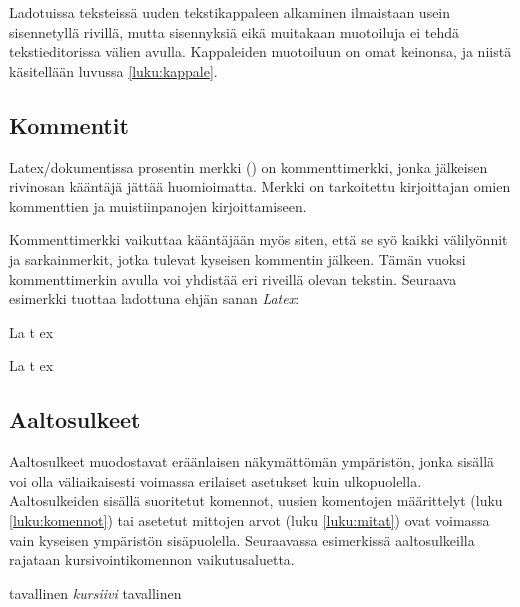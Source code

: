 Ladotuissa teksteissä uuden tekstikappaleen alkaminen ilmaistaan usein
sisennetyllä rivillä, mutta sisennyksiä eikä muitakaan muotoiluja ei
tehdä tekstieditorissa välien avulla. Kappaleiden muotoiluun on omat
keinonsa, ja niistä käsitellään luvussa \ref{luku:kappale}.

\subsection{Kommentit}

Latex\-/dokumentissa prosentin merkki (\koodi{\%}) on kommenttimerkki,
jonka jälkeisen rivin\-osan kääntäjä jättää huomioimatta. Merkki on
tarkoitettu kirjoittajan omien kommenttien ja muistiinpanojen
kirjoittamiseen.

\begin{koodilohkosis}
\end{koodilohkosis}

Kommenttimerkki vaikuttaa kääntäjään myös siten, että se syö kaikki
välilyönnit ja sarkainmerkit, jotka tulevat kyseisen kommentin jälkeen.
Tämän vuoksi kommenttimerkin avulla voi yhdistää eri riveillä olevan
tekstin. Seuraava esimerkki tuottaa ladottuna ehjän sanan \emph{Latex}:

\begin{koodilohkosis}
  La%
    t%
      ex
\end{koodilohkosis}

\begin{tulossis}
  La%
    t%
      ex
\end{tulossis}

\subsection{Aaltosulkeet}
\label{luku:aaltosulkeet}

Aaltosulkeet \mbox{\koodi{\{\}}} muodostavat eräänlaisen näkymättömän
ympäristön, jonka sisällä voi olla väliaikaisesti voimassa erilaiset
asetukset kuin ulkopuolella. Aaltosulkeiden sisällä suoritetut komennot,
uusien komentojen määrittelyt (luku \ref{luku:komennot}) tai asetetut
mittojen arvot (luku \ref{luku:mitat}) ovat voimassa vain kyseisen
ympäristön sisäpuolella. Seuraavassa esimerkissä aaltosulkeilla rajataan
kursivointikomennon  vai\-ku\-tus\-aluetta.


\begin{koodilohkosis}
  tavallinen {\itshape kursiivi} tavallinen
\end{koodilohkosis}

